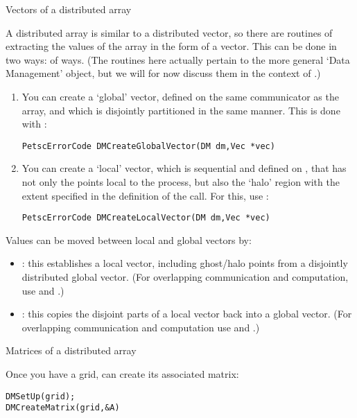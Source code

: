  {Vectors of a distributed array}

A distributed array is similar to a distributed vector, so there are routines of
extracting the values of the array in the form of a vector. This can be done in two ways:
of ways.
%
(The routines here actually pertain to the more general  `Data Management'
object, but we will for now discuss them in the context of .)
%
\begin{enumerate}
\item You can create a `global' vector, defined on the same communicator as the array,
  and which is disjointly partitioned in the same manner. This is done with
  :
\begin{lstlisting}
PetscErrorCode DMCreateGlobalVector(DM dm,Vec *vec)    
\end{lstlisting}
\item You can create a `local' vector,
  which is sequential and defined on ,
  that has not only the points local to the process, but also the `halo' region
  with the extent specified in the definition of the  call.
  For this, use :
\begin{lstlisting}
PetscErrorCode DMCreateLocalVector(DM dm,Vec *vec)
\end{lstlisting}
\end{enumerate}

Values can be moved between local and global vectors by:
\begin{itemize}
\item {}: this establishes a local vector,
  including ghost/halo points from a disjointly distributed global vector.
  (For overlapping communication and computation, use
   and .)
\item {}: this copies the disjoint parts
  of a local vector back into a global vector.
  (For overlapping communication and computation use
   and .)
\end{itemize}

 {Matrices of a distributed array}

Once you have a grid, can create its associated matrix:
\begin{lstlisting}
DMSetUp(grid);
DMCreateMatrix(grid,&A)
\end{lstlisting}

